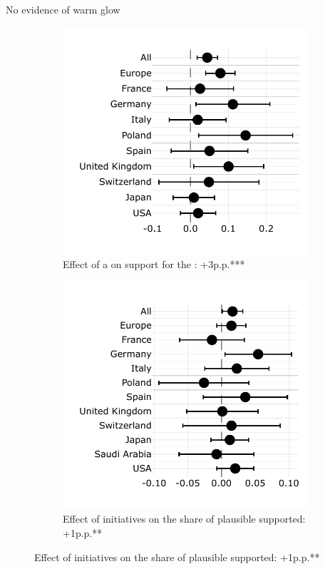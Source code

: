 \documentclass[aspectratio=169,xcolor=dvipsnames, 11pt,mathserif]{beamer}
\begin{document}
\begin{frame}{No evidence of warm glow\label{warm_glow}} 
    \begin{figure}
\begin{subfigure}{.47\textwidth}
  \caption[]{Effect of a  on support for the : +3p.p.*** \quad {}}
  \includegraphics[width=\textwidth]{../figures/country_comparison/gcs_support_by_variant_warm_glow.pdf}
\end{subfigure} \quad \pause
\begin{subfigure}{.47\textwidth}
  \caption[]{Effect of  initiatives on the share of plausible  supported: +1p.p.** \quad {} \hyperlink{2SLS}{}}
  \includegraphics[width=\textwidth]{../figures/country_comparison/share_solidarity_supported_by_info_solidarity.pdf}

\end{subfigure}
\end{figure}
\end{frame}
\end{document}
